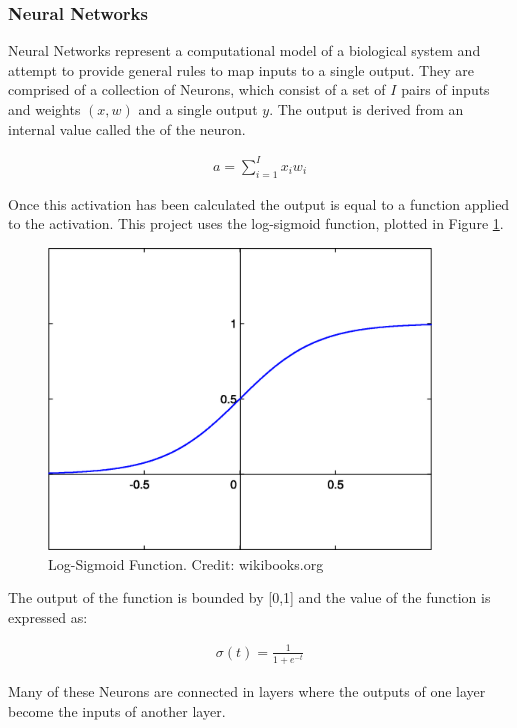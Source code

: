 \documentclass[12pt]{article}
\begin{document}
\subsubsection{Neural Networks}
Neural Networks represent a computational model of a biological system and attempt to provide general rules to map inputs to a single output. They are comprised of a collection of Neurons, which consist of a set of $I$ pairs of inputs and weights $(x, w)$ and a single output $y$. The output is derived from an internal value called the  of the neuron.

\begin{align*}
a = \sum_{i = 1}^I x_i w_i
\end{align*}

Once this activation has been calculated the output is equal to a function applied to the activation. This project uses the log-sigmoid function, plotted in Figure \ref{SigmoidFunction}.

\begin{figure}[H]
  \centering
  \includegraphics[width=4in]{SigmoidFunction}
  \caption[]{Log-Sigmoid Function. Credit: wikibooks.org}
  \label{SigmoidFunction}
\end{figure}

The output of the function is bounded by [0,1] and the value of the function is expressed as:

\begin{align*}
\sigma(t) = \frac{1}{1 + e^{-t}}
\end{align*}

Many of these Neurons are connected in layers where the outputs of one layer become the inputs of another layer.
\end{document}
